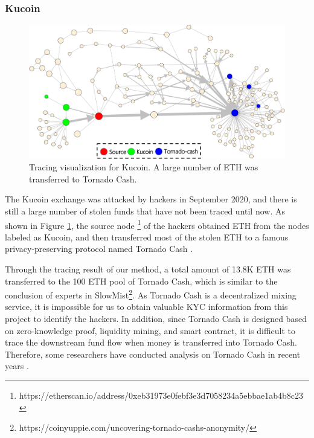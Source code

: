 

\subsubsection{Kucoin}
\begin{figure}[t]
    \centering
    \includegraphics[width=0.95\linewidth]{figures/kucoin.pdf}
    \caption{Tracing visualization for Kucoin. A large number of ETH was transferred to Tornado Cash.}
    \label{fig:ttr_example_kucoin}
\end{figure}
The Kucoin exchange was attacked by hackers in September 2020, and there is still a large number of stolen funds that have not been traced until now.
As shown in Figure \ref{fig:ttr_example_kucoin}, the source node \footnote{https://etherscan.io/address/0xeb31973e0febf3e3d7058234a5ebbae1ab4b8c23} of the hackers obtained ETH from the nodes labeled as Kucoin, and then transferred most of the stolen ETH to a famous privacy-preserving protocol named Tornado Cash \cite{tornadocashdoc}.

Through the tracing result of our method, a total amount of 13.8K ETH was transferred to the 100 ETH pool of Tornado Cash, which is similar to the conclusion of experts in SlowMist\footnote{https://coinyuppie.com/uncovering-tornado-cashs-anonymity/}. As Tornado Cash is a decentralized mixing service, it is impossible for us to obtain valuable KYC information from this project to identify the hackers. 
In addition, since Tornado Cash is designed based on zero-knowledge proof, liquidity mining, and smart contract, it is difficult to trace the downstream fund flow when money is transferred into Tornado Cash. Therefore, some researchers have conducted analysis on Tornado Cash in recent years \cite{beres2020blockchain}.